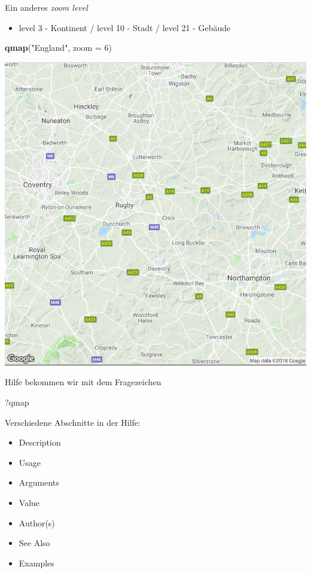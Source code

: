 \documentclass[ignorenonframetext,]{beamer}
\newenvironment{Shaded}{\begin{snugshade}}{\end{snugshade}}
\newcommand{\KeywordTok}[1]{\textcolor[rgb]{0.13,0.29,0.53}{\textbf{#1}}}
\newcommand{\DataTypeTok}[1]{\textcolor[rgb]{0.13,0.29,0.53}{#1}}
\newcommand{\DecValTok}[1]{\textcolor[rgb]{0.00,0.00,0.81}{#1}}
\newcommand{\StringTok}[1]{\textcolor[rgb]{0.31,0.60,0.02}{#1}}
\newcommand{\NormalTok}[1]{#1}
\providecommand{\tightlist}{%
  \setlength{\itemsep}{0pt}\setlength{\parskip}{0pt}}
\begin{document}
\begin{frame}[fragile]{Ein anderes \emph{zoom level}}

\begin{itemize}
\tightlist
\item
  level 3 - Kontinent / level 10 - Stadt / level 21 - Gebäude
\end{itemize}

\begin{Shaded}
\begin{Highlighting}[]
\KeywordTok{qmap}\NormalTok{(}\StringTok{"England"}\NormalTok{, }\DataTypeTok{zoom =} \DecValTok{6}\NormalTok{)}
\end{Highlighting}
\end{Shaded}

\includegraphics{figure/EnglandMap.PNG}

\end{frame}

\begin{frame}[fragile]{Hilfe bekommen wir mit dem Fragezeichen}

\begin{Shaded}
\begin{Highlighting}[]
\NormalTok{?qmap}
\end{Highlighting}
\end{Shaded}

Verschiedene Abschnitte in der Hilfe:

\begin{itemize}
\tightlist
\item
  Description
\item
  Usage
\item
  Arguments
\item
  Value
\item
  Author(s)
\item
  See Also
\item
  Examples
\end{itemize}

\end{frame}
\end{document}
